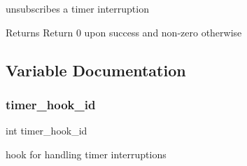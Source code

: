 unsubscribes a timer interruption 

\begin{DoxyReturn}{Returns}
Return 0 upon success and non-\/zero otherwise 
\end{DoxyReturn}


\subsection{Variable Documentation}
\hypertarget{group__timer_ga96e6321e488d93a8134897510c435eb7}{}\label{group__timer_ga96e6321e488d93a8134897510c435eb7} 
\subsubsection{\texorpdfstring{timer\+\_\+hook\+\_\+id}{timer\_hook\_id}}
{\footnotesize\ttfamily int timer\+\_\+hook\+\_\+id}



hook for handling timer interruptions 

